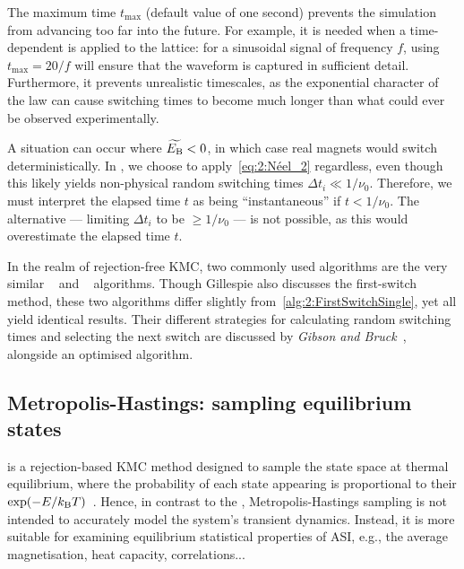 The maximum time $t_\mathrm{max}$ (default value of one second) prevents the simulation from advancing too far into the future.
For example, it is needed when a time-dependent  is applied to the lattice: for a sinusoidal signal of frequency $f$, using $t_{\mathrm{max}}=20/f$ will ensure that the waveform is captured in sufficient detail.
Furthermore, it prevents unrealistic timescales, as the exponential character of the  law can cause switching times to become much longer than what could ever be observed experimentally. \par
A situation can occur where $\widetilde{E_\mathrm{B}} < 0$, in which case real magnets would switch deterministically.
In \hotspice, we choose to apply~\cref{eq:2:Néel_2} regardless, even though this likely yields non-physical random switching times $\Delta t_i \ll 1/\nu_0$.
Therefore, we must interpret the elapsed time $t$ as being ``instantaneous'' if $t < 1/\nu_0$.
The alternative --- limiting $\Delta t_i$ to be $\geq 1/\nu_0$ --- is not possible, as this would overestimate the elapsed time $t$. \par
In the realm of rejection-free KMC, two commonly used algorithms are the very similar ~\cite{nfoldMCalgorithm} and ~\cite{gillespie1976general} algorithms.
Though Gillespie also discusses the first-switch method, these two algorithms differ slightly from~\cref{alg:2:FirstSwitchSingle}, yet all yield identical results.
Their different strategies for calculating random switching times and selecting the next switch are discussed by \textit{Gibson and Bruck}~\cite{GibsonBruck}, alongside an optimised algorithm.

\subsection{Metropolis-Hastings: sampling equilibrium states}\label{sec:2:Dynamics_MH}
 is a rejection-based KMC method designed to sample the state space at thermal equilibrium, where the probability of each state appearing is proportional to their  $\exp(-E/\kBT)$~\cite{IntroductionMC,kyimba2006comparisonIsingAlgorithms}.
Hence, in contrast to the , Metropolis-Hastings sampling is not intended to accurately model the system's transient dynamics.
Instead, it is more suitable for examining equilibrium statistical properties of ASI, e.g., the average magnetisation, heat capacity, correlations...~\cite{ApparentFMpinwheel} \par

